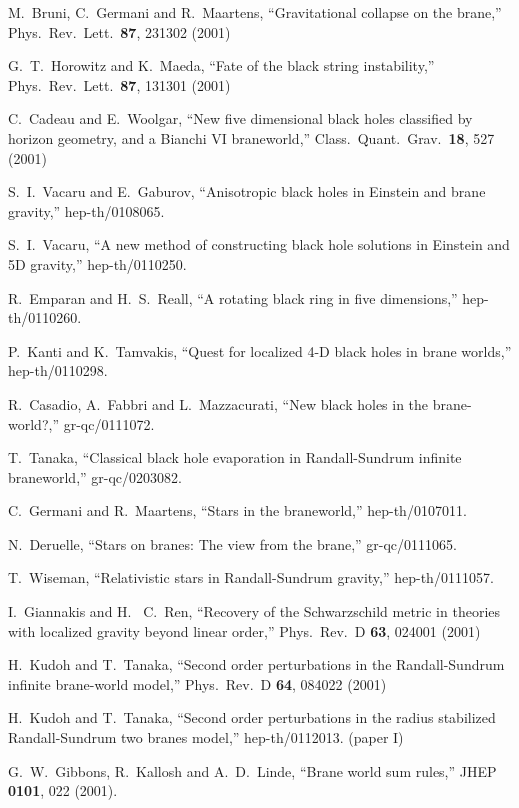 \documentclass[a4paper,showpacs,preprintnumbers,amsmath,amssymb]{revtex4}
\begin{document}
\begin{thebibliography}{99}
M.~Bruni, C.~Germani and R.~Maartens,
 ``Gravitational collapse on the brane,''
Phys.\ Rev.\ Lett.\  {\bf 87}, 231302 (2001)

  
G.~T.~Horowitz and K.~Maeda,
 ``Fate of the black string instability,''
Phys.\ Rev.\ Lett.\  {\bf 87}, 131301 (2001)
 

C.~Cadeau and E.~Woolgar,
 ``New five dimensional black holes classified by horizon geometry, and a  Bianchi VI braneworld,''
Class.\ Quant.\ Grav.\  {\bf 18}, 527 (2001)
 

 
S.~I.~Vacaru and E.~Gaburov,
 ``Anisotropic black holes in Einstein and brane gravity,''
 hep-th/0108065.

  
S.~I.~Vacaru,
 ``A new method of constructing black hole solutions in Einstein and 5D  gravity,''
 hep-th/0110250.
 

R.~Emparan and H.~S.~Reall,
 ``A rotating black ring in five dimensions,''
 hep-th/0110260.
 
P.~Kanti and K.~Tamvakis,
 ``Quest for localized 4-D black holes in brane worlds,''
 hep-th/0110298.
 
 
R.~Casadio, A.~Fabbri and L.~Mazzacurati,
 ``New black holes in the brane-world?,''
 gr-qc/0111072.

T.~Tanaka,
 ``Classical black hole evaporation in Randall-Sundrum infinite  braneworld,''
 gr-qc/0203082. 

 
 
C.~Germani and R.~Maartens,
 ``Stars in the braneworld,''
 hep-th/0107011.

N.~Deruelle,
 ``Stars on branes: The view from the brane,''
 gr-qc/0111065.
 

 
 
 

 
T.~Wiseman,
 ``Relativistic stars in Randall-Sundrum gravity,''
hep-th/0111057.
 
 
I.~Giannakis and H.~ C.~Ren,
 ``Recovery of the Schwarzschild metric in theories with localized gravity  beyond linear order,''
Phys.\ Rev.\ D {\bf 63}, 024001 (2001)


H.~Kudoh and T.~Tanaka,
 ``Second order perturbations in the Randall-Sundrum infinite brane-world  model,''
Phys.\ Rev.\ D {\bf 64}, 084022 (2001)
 

 H.~Kudoh and T.~Tanaka,
 ``Second order perturbations in the radius stabilized Randall-Sundrum two  branes model,''
 hep-th/0112013. (paper I)
 
G.~W.~Gibbons, R.~Kallosh and A.~D.~Linde,
 ``Brane world sum rules,''
JHEP {\bf 0101}, 022 (2001).



\end{thebibliography}  
\end{document}
